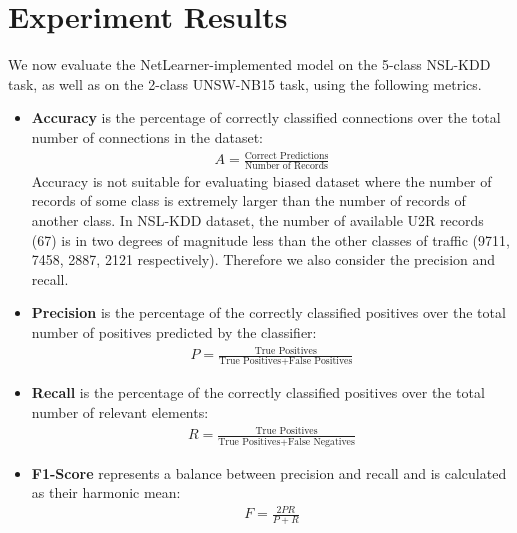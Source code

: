 \section{Experiment Results}

We now evaluate the NetLearner-implemented model on the 5-class NSL-KDD task,
as well as on the 2-class UNSW-NB15 task, using the following metrics.
\begin{itemize}
    \item \textbf{Accuracy} is the percentage of correctly classified connections
        over the total number of connections in the dataset:
        \begin{align}
            A = \frac{\text{Correct Predictions}}{\text{Number of Records}}
        \end{align} 
        Accuracy is not suitable for evaluating biased dataset where the number
        of records of some class is extremely larger than the number of
        records of another class.
        In NSL-KDD dataset, the number of available U2R records (67)
        is in two degrees of magnitude less than the other classes of traffic
        (9711, 7458, 2887, 2121 respectively).
        Therefore we also consider the precision and recall.
    \item \textbf{Precision} is the percentage of the correctly classified positives over
        the total number of positives predicted by the classifier:
                \begin{align}
                    P = \frac{\text{True Positives}}{\text{True Positives} + \text{False Positives}}
                \end{align}
    \item \textbf{Recall} is the percentage of the correctly classified positives over
        the total number of relevant elements:
                \begin{align}
                    R = \frac{\text{True Positives}}{\text{True Positives} + \text{False Negatives}}
                \end{align}
    \item \textbf{F1-Score} represents a balance between precision and recall and is calculated
        as their harmonic mean:
                \begin{align}
                    F = \frac{2PR}{P + R}
                \end{align}
\end{itemize}

